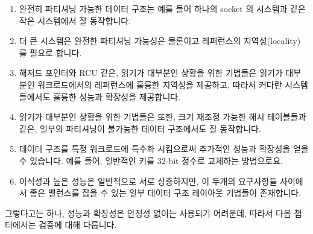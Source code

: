 \begin{enumerate}
\item	완전히 파티셔닝 가능한 데이터 구조는 예를 들어 하나의 socket 의
	시스템과 같은 작은 시스템에서 잘 동작합니다.
\item	더 큰 시스템은 완전한 파티셔닝 가능성은 물론이고 레퍼런스의
	지역성(locality) 를 필요로 합니다.
\item	해저드 포인터와 RCU 같은, 읽기가 대부분인 상황을 위한 기법들은 읽기가
	대부분인 워크로드에서의 레퍼런스에 훌륭한 지역성을 제공하고, 따라서
	커다란 시스템들에서도 훌륭한 성능과 확장성을 제공합니다.
\item	읽기가 대부분인 상황을 위한 기법들은 또한, 크기 재조정 가능한 해시
	테이블들과 같은, 일부의 파티셔닝이 불가능한 데이터 구조에서도 잘
	동작합니다.
\item	데이터 구조를 특정 워크로드에 특수화 시킴으로써 추가적인 성능과
	확장성을 얻을 수 있습니다.
	예를 들어, 일반적인 키를 32-bit 정수로 교체하는 방법으로요.
\item	이식성과 높은 성능은 일반적으로 서로 상충하지만, 이 두개의 요구사항들
	사이에서 좋은 밸런스를 잡을 수 있는 일부 데이터 구조 레이아웃 기법들이
	존재합니다.

\end{enumerate}

그렇다고는 하나, 성능과 확장성은 안정성 없이는 사용되기 어려운데, 따라서 다음
챕터에서는 검증에 대해 다룹니다.

